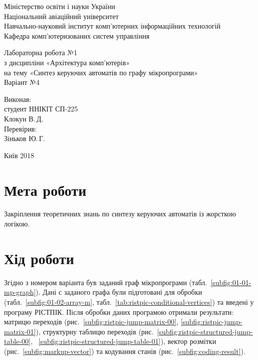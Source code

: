 \documentclass[a4paper,oneside,DIV=12,12pt]{scrartcl}
\newcommand{\allcaps}[1]{{\addfontfeatures{LetterSpace = 3}#1}}
\begin{document}
	\begin{titlepage}
	\centering
		Міністерство освіти і науки України\\
		Національний авіаційний університет\\
		Навчально-науковий інститут комп'ютерних інформаційних технологій\\
		Кафедра комп'ютеризованих систем управління

		\vspace*{\fill}

		Лабораторна робота №1\\
		з дисципліни «Архітектура комп'ютерів»\\
		на тему «Синтез керуючих автоматів по графу мікропрограми»\\
		Варіант №4

		\vspace*{\fill}
		
		\begin{flushright}
			Виконав:\\
			студент ННІКІТ СП-225\\
			Клокун В.\,Д.\\
			Перевірив:\\
			Зіньков Ю.\,Г.
		\end{flushright}

		Київ 2018
    \end{titlepage}
	
	\section{Мета роботи}
		Закріплення теоретичних знань по синтезу керуючих автоматів із жорсткою логікою.
		
	\section{Хід роботи}
		Згідно з номером варіанта був заданий граф мікропрограми (табл.~\ref{subfig:01-01-mp-graph}). Дані с заданого графа були підготовані для обробки (табл.~\ref{subfig:01-02-array-m}, табл.~\ref{tab:ristpic-conditional-vertices}) та введені у програму \allcaps{РІСТПІК}. Після обробки даних програмою отримали результати: матрицю переходів (рис.~\ref{subfig:ristpic-jump-matrix-00}, \ref{subfig:ristpic-jump-matrix-01}), структурну таблицю переходів (рис.~\ref{subfig:ristpic-structured-jump-table-00}, ~\ref{subfig:ristpic-structured-jump-table-01}), вектор розмітки (рис.~\ref{subfig:markup-vector}) та кодування станів (рис.~\ref{subfig:coding-result}).
		
\end{document}
